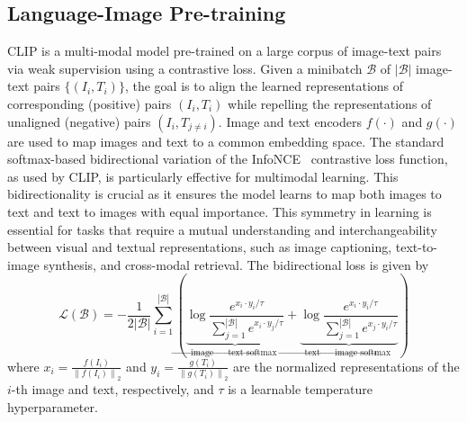 \documentclass[10pt]{article} %
\begin{document}
\subsection{Language-Image Pre-training}
\label{sec:pretraining}

CLIP \citep[Contrastive Language-Image Pretraining;][]{radford2021learning} is a multi-modal model pre-trained on a large corpus of image-text pairs via weak supervision using a contrastive loss. Given a minibatch $\mathcal{B}$ of $|\mathcal{B}|$ image-text pairs $\{(I_i, T_i)\}$, the goal is to align the learned representations of corresponding (positive) pairs $(I_i, T_i)$ while repelling the representations of unaligned (negative) pairs $(I_i, T_{j\neq i})$. Image and text encoders $f(\cdot)$ and $g(\cdot)$ are used to map images and text to a common embedding space. The standard softmax-based bidirectional variation of the InfoNCE~\citep{oord2018representation} contrastive loss function, as used by CLIP, is particularly effective for multimodal learning. This bidirectionality is crucial as it ensures the model learns to map both images to text and text to images with equal importance. This symmetry in learning is essential for tasks that require a mutual understanding and interchangeability between visual and textual representations, such as image captioning, text-to-image synthesis, and cross-modal retrieval. The bidirectional loss is given by \citep{radford2021learning}
\begin{equation}
\mathcal L(\mathcal B) = -\frac{1}{2|\mathcal{B}|} \sum_{i=1}^{|\mathcal{B}|}\left(\underbrace{\log \frac{e^{{x}_i \cdot {y}_i / \tau}}{\sum_{j=1}^{|\mathcal{B}|} e^{{x}_i \cdot {y}_j / \tau}}}_{\text {image } \rightarrow \text { text softmax }}+\underbrace{\log \frac{e^{{x}_i \cdot {y}_i / \tau}}{\sum_{j=1}^{|\mathcal{B}|} e^{{x}_j \cdot {y}_i / \tau}}}_{\text {text } \rightarrow \text { image softmax }}\right)
\end{equation}
where ${x}_i=\frac{f\left(I_i\right)}{\left\|f\left(I_i\right)\right\|_2}$ and ${y}_i=\frac{g\left(T_i\right)}{\left\|g\left(T_i\right)\right\|_2}$ are the normalized representations of the $i$-th image and text, respectively, and $\tau$ is a learnable temperature hyperparameter. 
\end{document}
